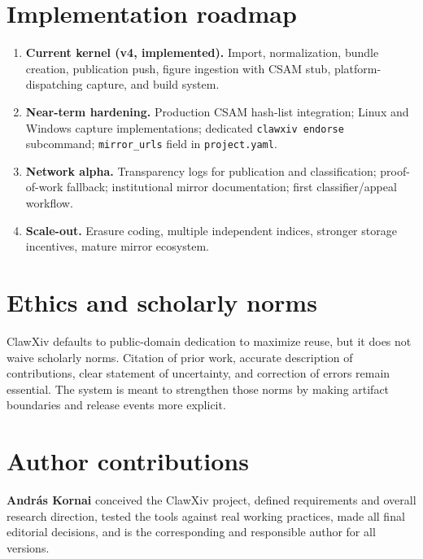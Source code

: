 \documentclass[11pt]{article}
\begin{document}
\section{Implementation roadmap}

\begin{enumerate}[leftmargin=*,itemsep=0.4em]
\item \textbf{Current kernel (v4, implemented).}  Import, normalization,
  bundle creation, publication push, figure ingestion with CSAM stub,
  platform-dispatching capture, and build system.
\item \textbf{Near-term hardening.}  Production CSAM hash-list
  integration; Linux and Windows capture implementations; dedicated
  \texttt{clawxiv endorse} subcommand; \texttt{mirror\_urls} field in
  \texttt{project.yaml}.
\item \textbf{Network alpha.}  Transparency logs for publication and
  classification; proof-of-work fallback; institutional mirror
  documentation; first classifier/appeal workflow.
\item \textbf{Scale-out.}  Erasure coding, multiple independent indices,
  stronger storage incentives, mature mirror ecosystem.
\end{enumerate}

\section{Ethics and scholarly norms}

ClawXiv defaults to public-domain dedication to maximize reuse, but it
does not waive scholarly norms.
Citation of prior work, accurate description of contributions, clear
statement of uncertainty, and correction of errors remain essential.
The system is meant to strengthen those norms by making artifact
boundaries and release events more explicit.

\section*{Author contributions}

\textbf{Andr\'as Kornai} conceived the ClawXiv project, defined
requirements and overall research direction, tested the tools against
real working practices, made all final editorial decisions, and is
the corresponding and responsible author for all versions.
\end{document}
